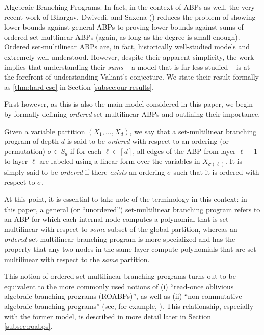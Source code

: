 \documentclass{article}
\begin{document}
\begin{paragraph}{Algebraic Branching Programs.}
    In fact, in the context of ABPs as well, the very recent work of Bhargav, Dwivedi, and Saxena (\cite{BDS23}) reduces the problem of showing lower bounds against general ABPs to proving lower bounds against sums of ordered set-multlinear ABPs (again, as long as the degree is small enough).
    Ordered set-multilinear ABPs are, in fact, historically well-studied models and extremely well-understood.
    However, despite their apparent simplicity, the work \cite{BDS23} implies that understanding their \emph{sums} -- a model that is far less studied -- is at the forefront of understanding Valiant’s conjecture.
    We state their result formally as \autoref{thm:hard-esc} in Section \ref{subsec:our-results}. 
    
    First however, as this is also the main model considered in this paper, we begin by formally defining \emph{ordered} set-multilinear ABPs and outlining their importance.     
\end{paragraph}

\begin{definition}\label{def:smABP}
Given a variable partition $(X_1,\ldots, X_d)$, we say that a set-multilinear branching program of depth $d$ is said to be \emph{ordered} with respect to an 
ordering (or permutation) $\sigma\in S_d$ if for each $\ell\in[d]$, all edges of the ABP from layer $\ell-1$ to layer $\ell$ are labeled using a linear form over the variables in $X_{\sigma(\ell)}$. It is simply said to be \emph{ordered} if there \emph{exists} an ordering $\sigma$ such that it is ordered with respect to $\sigma$.
\end{definition}

At this point, it is essential to take note of the terminology in this context: in this paper, a general (or ``unordered'') set-multilinear branching program refers to an ABP for which each internal node computes a polynomial that is set-multilinear with respect to \emph{some} subset of the global partition, whereas an \emph{ordered} set-multilinear branching program is more specialized and has the property that any two nodes in the same layer compute polynomials that are set-multilinear with respect to the \emph{same} partition.

\begin{remark}
    This notion of ordered set-multilinear branching programs turns out to be equivalent to the more commonly used notions of (i) ``read-once oblivious algebraic branching programs (ROABPs)'', as well as (ii) ``non-commutative algebraic branching programs'' (see, for example, \cite{ForbesS13}).
    This relationship, especially with the former model, is described in more detail later in Section \ref{subsec:roabps}.
\end{remark}
\end{document}
